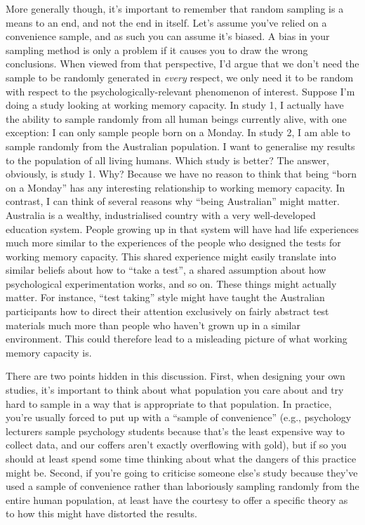 \documentclass[
  a4paper,
]{book}
\begin{document}
More generally though, it's important to remember that random sampling
is a means to an end, and not the end in itself. Let's assume you've
relied on a convenience sample, and as such you can assume it's biased.
A bias in your sampling method is only a problem if it causes you to
draw the wrong conclusions. When viewed from that perspective, I'd argue
that we don't need the sample to be randomly generated in \emph{every}
respect, we only need it to be random with respect to the
psychologically-relevant phenomenon of interest. Suppose I'm doing a
study looking at working memory capacity. In study 1, I actually have
the ability to sample randomly from all human beings currently alive,
with one exception: I can only sample people born on a Monday. In study
2, I am able to sample randomly from the Australian population. I want
to generalise my results to the population of all living humans. Which
study is better? The answer, obviously, is study 1. Why? Because we have
no reason to think that being ``born on a Monday'' has any interesting
relationship to working memory capacity. In contrast, I can think of
several reasons why ``being Australian'' might matter. Australia is a
wealthy, industrialised country with a very well-developed education
system. People growing up in that system will have had life experiences
much more similar to the experiences of the people who designed the
tests for working memory capacity. This shared experience might easily
translate into similar beliefs about how to ``take a test'', a shared
assumption about how psychological experimentation works, and so on.
These things might actually matter. For instance, ``test taking'' style
might have taught the Australian participants how to direct their
attention exclusively on fairly abstract test materials much more than
people who haven't grown up in a similar environment. This could
therefore lead to a misleading picture of what working memory capacity
is.

There are two points hidden in this discussion. First, when designing
your own studies, it's important to think about what population you care
about and try hard to sample in a way that is appropriate to that
population. In practice, you're usually forced to put up with a ``sample
of convenience'' (e.g., psychology lecturers sample psychology students
because that's the least expensive way to collect data, and our coffers
aren't exactly overflowing with gold), but if so you should at least
spend some time thinking about what the dangers of this practice might
be. Second, if you're going to criticise someone else's study because
they've used a sample of convenience rather than laboriously sampling
randomly from the entire human population, at least have the courtesy to
offer a specific theory as to how this might have distorted the results.
\end{document}
